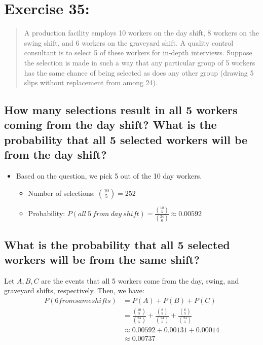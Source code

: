 \newpage
\section{Exercise 35:}
\begin{quote}
    A production facility employs 10 workers on the day shift, 8 workers on the swing shift, and 6 workers on the graveyard shift. A quality control consultant is to select 5 of these workers for in-depth interviews. Suppose the selection is made in such a way that any particular group of 5 workers has the same chance of being selected as does any other group (drawing 5 slips without replacement from among 24).
\end{quote}

\subsection{How many selections result in all 5 workers coming from the day shift? What is the probability that all 5 selected workers will be from the day shift?}
\begin{itemize}
    \item Based on the question, we pick 5 out of the 10 day workers.
          \begin{itemize}
              \item Number of selections: \(\binom{10}{5} = 252 \)
              \item Probability: \( P(all\ 5\ from\ day\ shift) = \frac{\binom{10}{5}}{\binom{24}{6}} \approx 0.00592 \)
          \end{itemize}
\end{itemize}

\subsection{What is the probability that all 5 selected workers will be from the same shift?}
Let \(A, B, C\) are the events that all 5 workers come from the day, swing, and graveyard shifts, respectively. Then, we have:
\begin{equation}
    \begin{split}
        P(6 from same shifts) & = P(A) + P(B) + P(C)                                                                                            \\
                              & = \frac{\binom{10}{5}}{\binom{24}{5}} + \frac{\binom{8}{5}}{\binom{24}{5}} + \frac{\binom{6}{5}}{\binom{24}{5}} \\
                              & \approx 0.00592 + 0.00131 + 0.00014                                                                             \\
                              & \approx 0.00737
    \end{split}
\end{equation}

